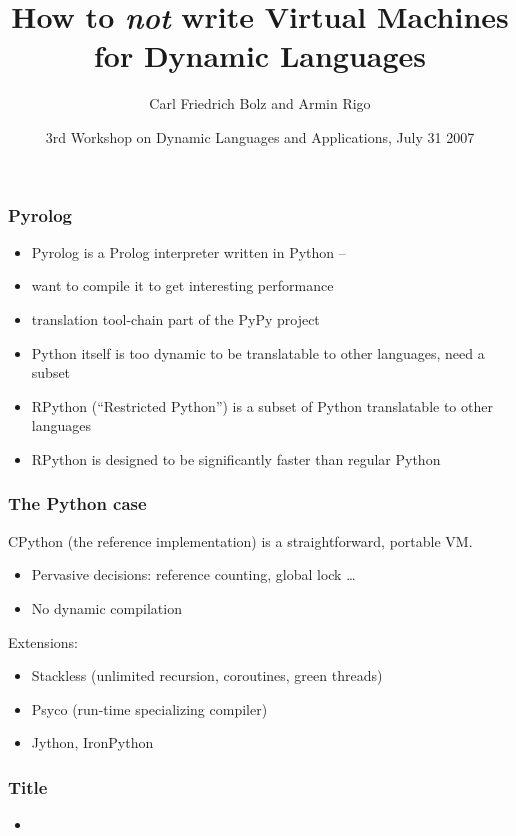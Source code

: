 \documentclass[utf8x]{beamer}
\title{How to \emph{not} write Virtual Machines for Dynamic Languages}
\author{Carl Friedrich Bolz and Armin Rigo}
\institute[Heinrich-Heine-Universität Düsseldorf]
{
  Institut für Informatik\\
  Heinrich-Heine-Universität Düsseldorf
}
\date{3rd Workshop on Dynamic Languages and Applications, July 31 2007}
\begin{document}
\begin{frame}
  \titlepage
\end{frame}



\begin{frame}
  \frametitle{Pyrolog}

  \begin{itemize}
  \item
    Pyrolog is a Prolog interpreter written in Python –
  \item
    want to compile it to get interesting performance
  \item
    translation tool-chain part of the PyPy project
  \item
    Python itself is too dynamic to be translatable to other languages, need a subset
  \item
    RPython (``Restricted Python'') is a subset of Python translatable to other
    languages
  \item
    RPython is designed to be significantly faster than regular Python
  \end{itemize}
\end{frame}


\begin{frame}
  \frametitle{The Python case}
  CPython (the reference implementation) is a straightforward, portable VM.

  \begin{itemize}
  \item
    Pervasive decisions: reference counting, global lock \dots
  \item
    No dynamic compilation
  \end{itemize}
  \pause
  \begin{block}{
    Extensions:}
    \begin{itemize}
    \item
      \alert{Stackless} (unlimited recursion, coroutines, green threads)
    \item
      \alert{Psyco} (run-time specializing compiler)
    \item
      \alert{Jython}, \alert{IronPython}
    \end{itemize}
  \end{block}
\end{frame}


\begin{frame}
  \frametitle{Title}
  \begin{itemize}
  \item
  \end{itemize}
\end{frame}
\end{document}
